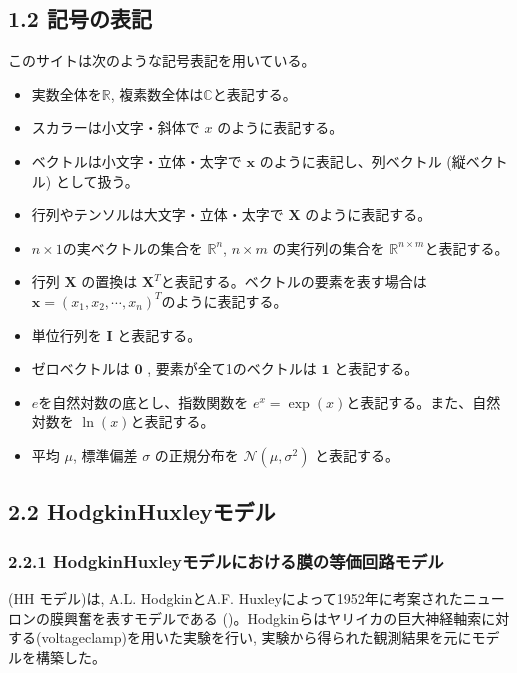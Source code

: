 \documentclass[letterpaper,10pt,english]{sphinxmanual}
\begin{document}
\subsection{1.2 記号の表記}
\label{\detokenize{notation:id1}}\label{\detokenize{notation::doc}}
このサイトは次のような記号表記を用いている。
\begin{itemize}
\item {} 
実数全体を\(\mathbb{R}\), 複素数全体は\(\mathbb{C}\)と表記する。

\item {} 
スカラーは小文字・斜体で \(x\) のように表記する。

\item {} 
ベクトルは小文字・立体・太字で \(\mathbf{x}\) のように表記し、列ベクトル (縦ベクトル) として扱う。

\item {} 
行列やテンソルは大文字・立体・太字で \(\mathbf{X}\) のように表記する。

\item {} 
\(n\times 1\)の実ベクトルの集合を \(\mathbb{R}^n\), \(n\times m\) の実行列の集合を \(\mathbb{R}^{n\times m}\)と表記する。

\item {} 
行列 \(\mathbf{X}\) の置換は \(\mathbf{X}^T\)と表記する。ベクトルの要素を表す場合は \(\mathbf{x} = (x_1, x_2,\cdots, x_n)^T\)のように表記する。

\item {} 
単位行列を \(\mathbf{I}\) と表記する。

\item {} 
ゼロベクトルは \(\mathbf{0}\) , 要素が全て1のベクトルは \(\mathbf{1}\) と表記する。

\item {} 
\(e\)を自然対数の底とし、指数関数を \(e^x=\exp(x)\)と表記する。また、自然対数を \(\ln(x)\)と表記する。

\item {} 
平均 \(\mu\), 標準偏差 \(\sigma\) の正規分布を \(\mathcal{N}(\mu, \sigma^2)\) と表記する。

\end{itemize}


\subsection{2.2 Hodgkin\sphinxhyphen{}Huxleyモデル}
\label{\detokenize{2-2_hodgkinhuxley:hodgkin-huxley}}\label{\detokenize{2-2_hodgkinhuxley::doc}}

\subsubsection{2.2.1 Hodgkin\sphinxhyphen{}Huxleyモデルにおける膜の等価回路モデル}
\label{\detokenize{2-2_hodgkinhuxley:id1}}
 (HH モデル)は, A.L. HodgkinとA.F. Huxleyによって1952年に考案されたニューロンの膜興奮を表すモデルである ()。Hodgkinらはヤリイカの巨大神経軸索に対する(voltage\sphinxhyphen{}clamp)を用いた実験を行い, 実験から得られた観測結果を元にモデルを構築した。
\end{document}
